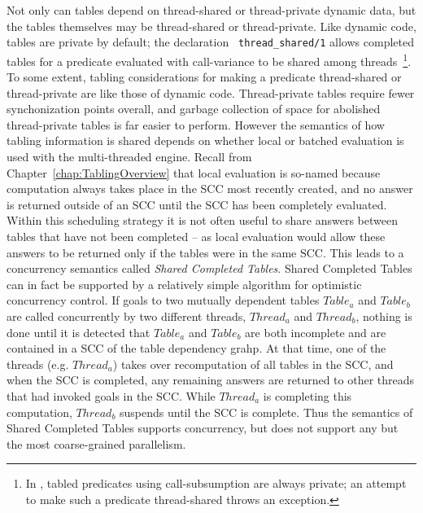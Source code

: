 Not only can tables depend on thread-shared or thread-private dynamic
data, but 
the tables themselves may be thread-shared or thread-private.  Like
dynamic code, tables are private by default; the declaration {\tt
  thread\_shared/1} allows completed tables for a predicate evaluated
with call-variance to be shared among threads~\footnote{In \version,
  tabled predicates using call-subsumption are always private; an
  attempt to make such a predicate thread-shared throws an
  exception.}.
%
To some extent, tabling considerations for making a predicate
thread-shared or thread-private are like those of dynamic code.
Thread-private tables require fewer synchonization points overall, and
garbage collection of space for abolished thread-private tables is far
easier to perform.  However the semantics of how tabling information
is shared depends on whether local or batched evaluation is used with
the multi-threaded engine.  Recall from
Chapter~\ref{chap:TablingOverview} that local evaluation is so-named
because computation always takes place in the SCC most recently
created, and no answer is returned outside of an SCC until the SCC has
been completely evaluated.  Within this scheduling strategy it is not
often useful to share answers between tables that have not been
completed -- as local evaluation would allow these answers to be
returned only if the tables were in the same SCC.  This leads to a
concurrency semantics called {\em Shared Completed Tables}.  Shared
Completed Tables can in fact be supported by a relatively simple
algorithm for optimistic concurrency control.  If goals to two
mutually dependent tables $Table_a$ and $Table_b$ are called
concurrently by two different threads, $Thread_a$ and $Thread_b$,
nothing is done until it is detected that $Table_a$ and $Table_b$ are
both incomplete and are contained in a SCC of the table dependency
grahp.  At that time, one of the threads (e.g. $Thread_a$) takes over
recomputation of all tables in the SCC, and when the SCC is completed,
any remaining answers are returned to other threads that had invoked
goals in the SCC.  While $Thread_a$ is completing this computation,
$Thread_b$ suspends until the SCC is complete.  Thus the semantics of
Shared Completed Tables supports concurrency, but does not support any
but the most coarse-grained parallelism.

